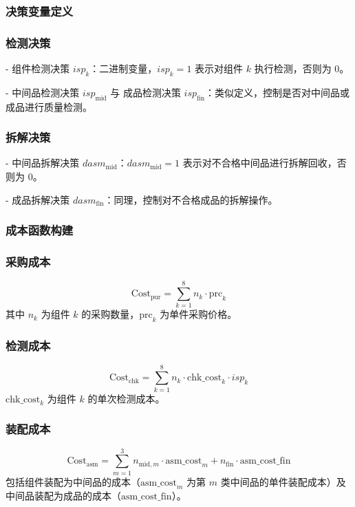 \documentclass{article}
\begin{document}
	\subsubsection*{决策变量定义}  
	\subsubsection*{检测决策}  
	- 组件检测决策 \(isp_k\)：二进制变量，\(isp_k=1\) 表示对组件 \(k\) 执行检测，否则为 \(0\)。  \par
	- 中间品检测决策 \(isp_{\text{mid}}\) 与 成品检测决策 \(isp_{\text{fin}}\)：类似定义，控制是否对中间品或成品进行质量检测。  
	
	\subsubsection*{拆解决策}  
	- 中间品拆解决策 \(dasm_{\text{mid}}\)：\(dasm_{\text{mid}}=1\) 表示对不合格中间品进行拆解回收，否则为 \(0\)。\par
	- 成品拆解决策 \(dasm_{\text{fin}}\)：同理，控制对不合格成品的拆解操作。  
	
	\subsubsection*{成本函数构建}  
	\subsubsection*{采购成本}  
	\[
	\text{Cost}_{\text{pur}} = \sum_{k=1}^8 n_k \cdot \text{prc}_k
	\]  
	其中 \(n_k\) 为组件 \(k\) 的采购数量，\(\text{prc}_k\) 为单件采购价格。  
	
	\subsubsection*{检测成本}  
	\[
	\text{Cost}_{\text{chk}} = \sum_{k=1}^8 n_k \cdot \text{chk\_cost}_k \cdot isp_k
	\]  
	\(\text{chk\_cost}_k\) 为组件 \(k\) 的单次检测成本。  
	
	\subsubsection*{装配成本}  
	\[
	\text{Cost}_{\text{asm}} = \sum_{m=1}^3 n_{\text{mid},m} \cdot \text{asm\_cost}_m + n_{\text{fin}} \cdot \text{asm\_cost\_fin}
	\]  
	包括组件装配为中间品的成本（\(\text{asm\_cost}_m\) 为第 \(m\) 类中间品的单件装配成本）及中间品装配为成品的成本（\(\text{asm\_cost\_fin}\)）。  
	
\end{document}
